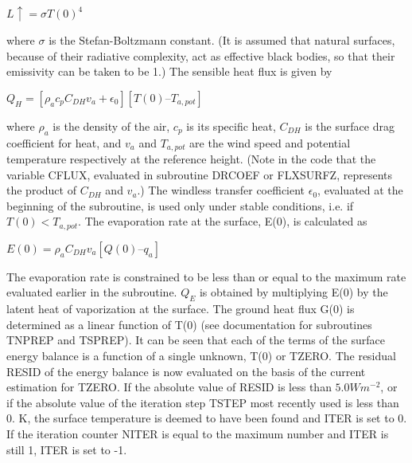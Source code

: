 $L \uparrow = \sigma T(0)^4$

where $\sigma$ is the Stefan-\/\+Boltzmann constant. (It is assumed that natural surfaces, because of their radiative complexity, act as effective black bodies, so that their emissivity can be taken to be 1.) The sensible heat flux is given by

$Q_H = [\rho_a c_p C_{DH} v_a + \epsilon_0] [T(0) – T_{a,pot}]$

where $\rho_a$ is the density of the air, $c_p$ is its specific heat, $C_{DH}$ is the surface drag coefficient for heat, and $v_a$ and $T_{a,pot}$ are the wind speed and potential temperature respectively at the reference height. (Note in the code that the variable C\+F\+L\+U\+X, evaluated in subroutine D\+R\+C\+O\+E\+F or F\+L\+X\+S\+U\+R\+F\+Z, represents the product of $C_{DH}$ and $v_a$.) The windless transfer coefficient $\epsilon_0$, evaluated at the beginning of the subroutine, is used only under stable conditions, i.\+e. if $T(0) < T_{a,pot}$. The evaporation rate at the surface, E(0), is calculated as

$E(0) = \rho_a C_{DH} v_a [Q(0) – q_a]$

The evaporation rate is constrained to be less than or equal to the maximum rate evaluated earlier in the subroutine. $Q_E$ is obtained by multiplying E(0) by the latent heat of vaporization at the surface. The ground heat flux G(0) is determined as a linear function of T(0) (see documentation for subroutines T\+N\+P\+R\+E\+P and T\+S\+P\+R\+E\+P). It can be seen that each of the terms of the surface energy balance is a function of a single unknown, T(0) or T\+Z\+E\+R\+O. The residual R\+E\+S\+I\+D of the energy balance is now evaluated on the basis of the current estimation for T\+Z\+E\+R\+O. If the absolute value of R\+E\+S\+I\+D is less than $5.0 W m^{-2}$, or if the absolute value of the iteration step T\+S\+T\+E\+P most recently used is less than 0. K, the surface temperature is deemed to have been found and I\+T\+E\+R is set to 0. If the iteration counter N\+I\+T\+E\+R is equal to the maximum number and I\+T\+E\+R is still 1, I\+T\+E\+R is set to -\/1.

